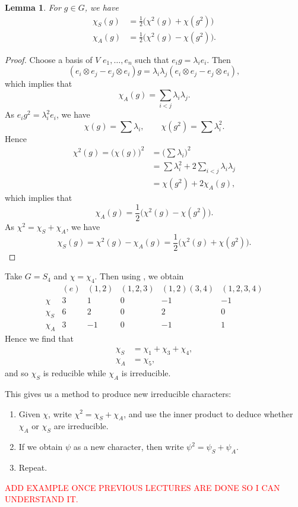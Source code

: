 \documentclass[11pt, notitlepage]{article}
\numberwithin{equation}{section}
\theoremstyle{plain}
\newtheorem{lemma}[theorem]{Lemma}
\theoremstyle{definition}
\newenvironment{example}
	{\pushQED{\qed}\renewcommand{\qedsymbol}{$\blacktriangleleft$}\examplex}
	{\popQED\endexamplex}
\begin{document}
\begin{lemma}
For $g \in G$, we have
\begin{align*}
    \chi_S(g) &= \frac{1}{2}\big(\chi^2(g) + \chi(g^2)\big)\\
    \chi_A(g) &= \frac{1}{2}\big(\chi^2(g) - \chi(g^2)\big).
\end{align*}
\end{lemma}

\begin{proof}
Choose a basis of $V$ $e_1,\dots,e_n$ such that $e_ig = \lambda_i e_i$. Then
\[
    (e_i \otimes e_j - e_j \otimes e_i)g = \lambda_i\lambda_j(e_i \otimes e_j - e_j \otimes e_i),
\]
which implies that
\[
    \chi_A(g) = \sum_{i<j}\lambda_i\lambda_j.
\]
As $e_ig^2 = \lambda_i^2e_i$, we have
\[
    \chi(g) = \sum \lambda_i, \qquad \chi(g^2) = \sum \lambda_i^2.
\]
Hence
\begin{align*}
    \chi^2(g) = \big(\chi(g)\big)^2 &= \Big(\sum \lambda_i\Big)^2\\
    &= \sum \lambda_i^2 + 2\sum_{i < j}\lambda_i \lambda_j\\
    &= \chi(g^2) + 2\chi_A(g),
\end{align*}
which implies that
\[
    \chi_A(g) = \frac{1}{2}\big(\chi^2(g) - \chi(g^2)\big).
\]
As $\chi^2 = \chi_S + \chi_A$, we have
\[
    \chi_S(g) = \chi^2(g) - \chi_A(g) = \frac{1}{2}\big(\chi^2(g) + \chi(g^2)\big).
\]
\end{proof}


\begin{example}
Take $G = S_4$ and $\chi = \chi_4$. Then using , we obtain
\[
    \begin{array}{c|ccccc}
               & (e) & (1,2) & (1,2,3) & (1,2)(3,4) & (1,2,3,4) \\\hline
        \chi   &  3  &   1   &    0    &     -1     &     -1    \\
        \chi_S &  6  &   2   &    0    &      2     &      0\\
        \chi_A &  3  &  -1   &    0    &     -1     &      1
    \end{array}
\]
Hence we find that
\begin{align*}
    \chi_S &= \chi_1 + \chi_3 + \chi_4,\\
    \chi_A &= \chi_5,
\end{align*}
and so $\chi_S$ is reducible while $\chi_A$ is irreducible.
\end{example}

This gives us a method to produce new irreducible characters:
\begin{enumerate}[label=(\arabic*)]
    \item Given $\chi$, write $\chi^2 = \chi_S + \chi_A$, and use the inner product to deduce whether $\chi_A$ or $\chi_S$ are irreducible.

    \item If we obtain $\psi$ as a new character, then write $\psi^2 = \psi_S + \psi_A$.

    \item Repeat.
\end{enumerate}


\textcolor{red}{ADD EXAMPLE ONCE PREVIOUS LECTURES ARE DONE SO I CAN UNDERSTAND IT.}
\end{document}

